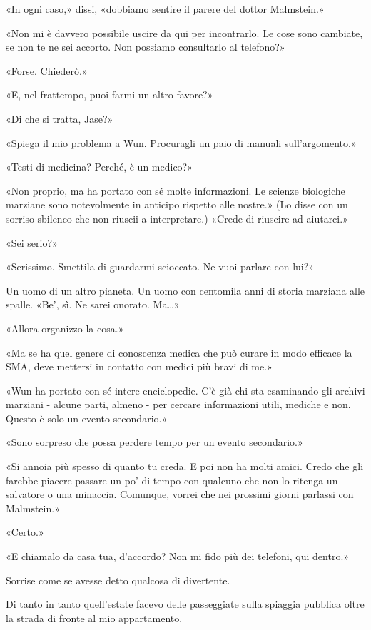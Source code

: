 «In ogni caso,» dissi, «dobbiamo sentire il parere del dottor
Malmstein.»

«Non mi è davvero possibile uscire da qui per incontrarlo. Le cose sono
cambiate, se non te ne sei accorto. Non possiamo consultarlo al
telefono?»

«Forse. Chiederò.»

«E, nel frattempo, puoi farmi un altro favore?»

«Di che si tratta, Jase?»

«Spiega il mio problema a Wun. Procuragli un paio di manuali
sull'argomento.»

«Testi di medicina? Perché, è un medico?»

«Non proprio, ma ha portato con sé molte informazioni. Le scienze
biologiche marziane sono notevolmente in anticipo rispetto alle nostre.»
(Lo disse con un sorriso sbilenco che non riuscii a interpretare.)
«Crede di riuscire ad aiutarci.»

«Sei serio?»

«Serissimo. Smettila di guardarmi scioccato. Ne vuoi parlare con lui?»

Un uomo di un altro pianeta. Un uomo con centomila anni di storia
marziana alle spalle. «Be', sì. Ne sarei onorato. Ma\ldots»

«Allora organizzo la cosa.»

«Ma se ha quel genere di conoscenza medica che può curare in modo
efficace la SMA, deve mettersi in contatto con medici più bravi di me.»

«Wun ha portato con sé intere enciclopedie. C'è già chi sta esaminando
gli archivi marziani - alcune parti, almeno - per cercare informazioni
utili, mediche e non. Questo è solo un evento secondario.»

«Sono sorpreso che possa perdere tempo per un evento secondario.»

«Si annoia più spesso di quanto tu creda. E poi non ha molti amici.
Credo che gli farebbe piacere passare un po' di tempo con qualcuno che
non lo ritenga un salvatore o una minaccia. Comunque, vorrei che nei
prossimi giorni parlassi con Malmstein.»

«Certo.»

«E chiamalo da casa tua, d'accordo? Non mi fido più dei telefoni, qui
dentro.»

Sorrise come se avesse detto qualcosa di divertente.

\separatorefiori

Di tanto in tanto quell'estate facevo delle passeggiate sulla spiaggia
pubblica oltre la strada di fronte al mio appartamento.

